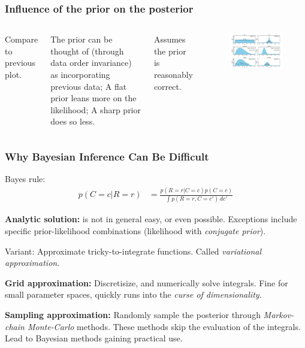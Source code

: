 \documentclass[usenames,dvipsnames,table]{beamer}
\begin{document}
\begin{frame}
\frametitle{Influence of the prior on the posterior}
\begin{columns}[c]
Compare to previous plot.

\vspace{1em}
The prior can be thought of (through data order invariance) as incorporating previous data; A flat prior leans more on the likelihood; A sharp prior does so less.

\vspace{1em}
Assumes the prior is reasonably correct.

\begin{figure}
\centering
\includegraphics[width=\linewidth]{img/fig5_3}
\end{figure}
\end{columns}
\end{frame}




\begin{frame}
\frametitle{Why Bayesian Inference Can Be Difficult}

Bayes rule:
\begin{align*}
p(C=c\vert R=r) &= \frac{p(R=r\vert C=c) p(C=c)}{\int p(R=r, C=c')\, dc'}
\end{align*}

\textbf{Analytic solution:} is not in general easy, or even possible. Exceptions include specific prior-likelihood combinations (likelihood with \emph{conjugate prior}).

Variant: Approximate tricky-to-integrate functions. Called \emph{variational approximation}.

\vspace{1em}
\textbf{Grid approximation:} Discretisize, and numerically solve integrals. Fine for small parameter spaces, quickly runs into the \emph{curse of dimensionality}.

\vspace{1em}
\textbf{Sampling approximation:} Randomly sample the posterior through \emph{Markov-chain Monte-Carlo} methods. These methods skip the evaluation of the integrals. Lead to Bayesian methods gaining practical use.

\end{frame}
\end{document}
